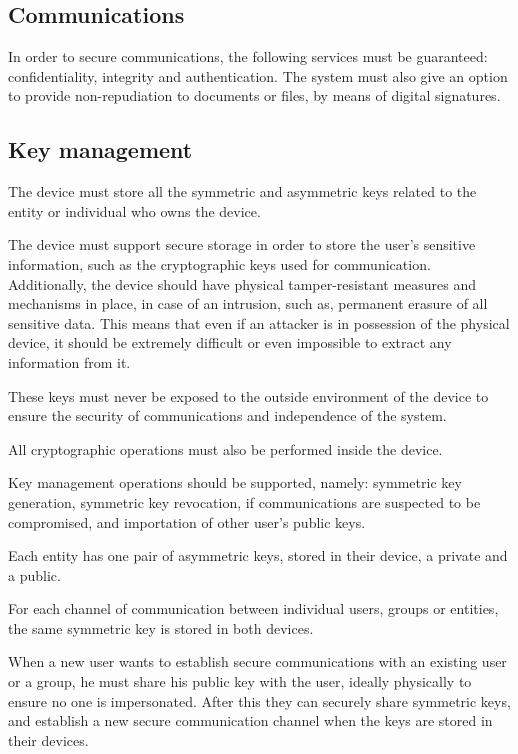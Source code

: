 \subsection{Communications}\label{chap:problem:services:comms}
In order to secure communications, the following services must be guaranteed: confidentiality, integrity and authentication.
The system must also give an option to provide non-repudiation to documents or files, by means of digital signatures.

\subsection{Key management}\label{chap:problem:services:key}
The device must store all the symmetric and asymmetric keys related to the entity or individual who owns the device.

The device must support secure storage in order to store the user's sensitive information, such as the cryptographic keys used for communication.
Additionally, the device should have physical tamper-resistant measures and mechanisms in place, in case of an intrusion, such as, permanent erasure of all sensitive data. 
This means that even if an attacker is in possession of the physical device, it should be extremely difficult or even impossible to extract any information from it.

These keys must never be exposed to the outside environment of the device to ensure the security of communications and independence of the system.

All cryptographic operations must also be performed inside the device.

Key management operations should be supported, namely: symmetric key generation, symmetric key revocation, if communications are suspected to be compromised, and importation of other user's public keys.

Each entity has one pair of asymmetric keys, stored in their device, a private and a public.

For each channel of communication between individual users, groups or entities, the same symmetric key is stored in both devices.

When a new user wants to establish secure communications with an existing user or a group, he must share his public key with the user, ideally physically to ensure no one is impersonated. After this they can securely share symmetric keys, and establish a new secure communication channel when the keys are stored in their devices.

